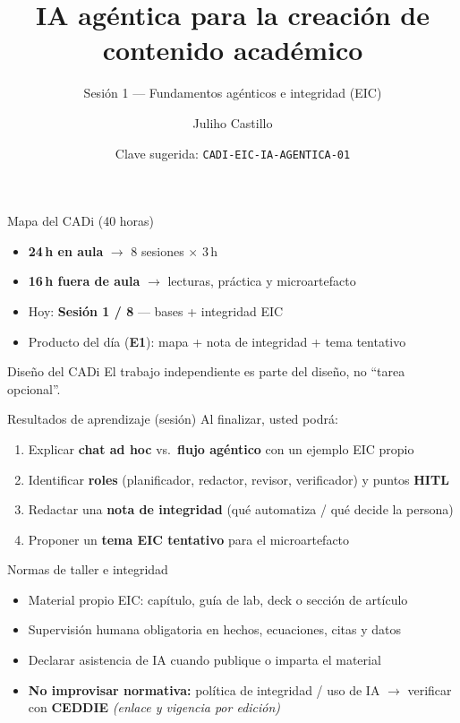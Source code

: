 \documentclass[aspectratio=169,11pt]{beamer}
\title{IA agéntica para la creación de contenido académico}
\subtitle{Sesión 1 --- Fundamentos agénticos e integridad (EIC)}
\author{Juliho Castillo}
\institute{CADi 40\,h · Escuela de Ingeniería y Ciencias\\
Tecnológico de Monterrey}
\date{Clave sugerida: \texttt{CADI-EIC-IA-AGENTICA-01}}
\begin{document}
\begin{frame}
\titlepage
\end{frame}

\begin{frame}{Mapa del CADi (40 horas)}
\begin{itemize}
\item \textbf{24\,h en aula} $\rightarrow$ 8 sesiones $\times$ 3\,h
\item \textbf{16\,h fuera de aula} $\rightarrow$ lecturas, práctica y microartefacto
\item Hoy: \textbf{Sesión 1 / 8} --- bases + integridad EIC
\item Producto del día (\textbf{E1}): mapa + nota de integridad + tema tentativo
\end{itemize}
\begin{block}{Diseño del CADi}
El trabajo independiente es parte del diseño, no ``tarea opcional''.
\end{block}
\end{frame}

\begin{frame}{Resultados de aprendizaje (sesión)}
Al finalizar, usted podrá:
\begin{enumerate}
\item Explicar \textbf{chat ad hoc} vs.\ \textbf{flujo agéntico} con un ejemplo EIC propio
\item Identificar \textbf{roles} (planificador, redactor, revisor, verificador) y puntos \textbf{HITL}
\item Redactar una \textbf{nota de integridad} (qué automatiza / qué decide la persona)
\item Proponer un \textbf{tema EIC tentativo} para el microartefacto
\end{enumerate}
\end{frame}

\begin{frame}{Normas de taller e integridad}
\begin{itemize}
\item Material propio EIC: capítulo, guía de lab, deck o sección de artículo
\item Supervisión humana obligatoria en hechos, ecuaciones, citas y datos
\item Declarar asistencia de IA cuando publique o imparta el material
\item \textbf{No improvisar normativa:} política de integridad / uso de IA $\rightarrow$ verificar con \textbf{CEDDIE} \emph{(enlace y vigencia por edición)}
\end{itemize}
\end{frame}
\end{document}
